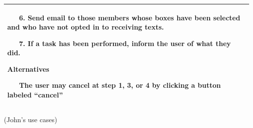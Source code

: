 \documentclass[letterpaper]{article}
\begin{document}
\begin{flushleft}
\begin{supertabular}{|m{6.42126in}|}
{\color{black} \ \ \ 6. Send email to those members whose boxes have
been selected and who have not opted in to receiving texts.}

{\color{black} \ \ \ 7. If a task has been performed, inform the user of
what they did.}

{\bfseries\color{black} Alternatives}

\color{black} \ \ \ The user may cancel at step 1, 3, or 4 by clicking a
button labeled {\textquotedblleft}cancel{\textquotedblright}\\\hline
\end{supertabular}
\end{flushleft}

\bigskip


\bigskip


\bigskip


\bigskip

{\color{black}
(John{\textquoteright}s use cases)}


\bigskip


\bigskip
\end{document}
